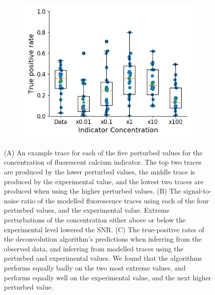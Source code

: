 \begin{figure}[p]
\begin{subfigure}{0.45\textwidth}
        \includegraphics[width=\linewidth]{figures/calcium_chapter/indictor_perturbed_oasis_first_paper.png}
        \caption{}
        \label{fig:indicator_perturbed_inference}
    \end{subfigure}
    \caption{(A) An example trace for each of the five perturbed values for the concentration of fluorescent calcium indicator. The top two traces are produced by the lower perturbed values, the middle trace is produced by the experimental value, and the lowest two traces are produced when using the higher perturbed values. (B) The signal-to-noise ratio of the modelled fluorescence traces using each of the four perturbed values, and the experimental value. Extreme perturbations of the concentration either above or below the experimental level lowered the SNR. (C) The true-positive rates of the deconvolution algorithm's predictions when inferring from the observed data, and inferring from modelled traces using the perturbed and experimental values. We found that the algorithms performs equally badly on the two most extreme values, and performs equally well on the experimental value, and the next higher perturbed value.}
    \label{fig:indicator_perturbed}
\end{figure}

